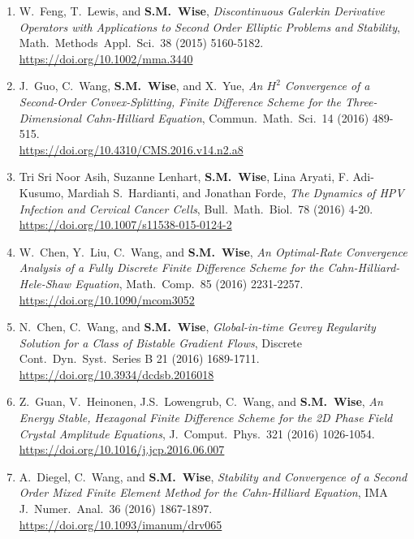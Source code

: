 \documentclass[10pt,letterpaper]{article}
\begin{document}
\begin{enumerate}
	\item    
W.~Feng, T.~Lewis, and \textbf{S.M.~Wise}, {\sl Discontinuous Galerkin Derivative Operators with Applications to Second Order Elliptic Problems and Stability}, Math.~Methods~Appl.~Sci.~38 (2015) 5160-5182.
	\\ 
\url{https://doi.org/10.1002/mma.3440}  

	\item
J.~Guo, C.~Wang, \textbf{S.M.~Wise}, and X.~Yue, {\sl An $H^2$ Convergence of a Second-Order Convex-Splitting, Finite Difference Scheme for the Three-Dimensional Cahn-Hilliard Equation}, Commun.~Math.~Sci.~14 (2016) 489-515.
	\\ 
\url{https://doi.org/10.4310/CMS.2016.v14.n2.a8}

	\item
Tri Sri Noor Asih, Suzanne Lenhart, \textbf{S.M.~Wise}, Lina Aryati, F. Adi-Kusumo, Mardiah S.~Hardianti, and Jonathan Forde, {\sl The Dynamics of HPV Infection and Cervical Cancer Cells}, Bull.~Math.~Biol.~78 (2016) 4-20.
	\\ 
\url{https://doi.org/10.1007/s11538-015-0124-2}

	\item
W.~Chen, Y.~Liu, C.~Wang, and \textbf{S.M.~Wise}, {\sl An Optimal-Rate Convergence Analysis of a Fully Discrete Finite Difference Scheme for the Cahn-Hilliard-Hele-Shaw Equation}, Math.~Comp.~85 (2016) 2231-2257.
	\\ 
\url{https://doi.org/10.1090/mcom3052}

	\item
N.~Chen, C.~Wang, and \textbf{S.M.~Wise}, {\sl Global-in-time Gevrey Regularity Solution for a Class of Bistable Gradient Flows}, Discrete Cont.~Dyn.~Syst.~Series B 21 (2016) 1689-1711.
	\\ 
\url{https://doi.org/10.3934/dcdsb.2016018}

	\item
Z.~Guan, V.~Heinonen, J.S.~Lowengrub, C.~Wang, and \textbf{S.M.~Wise}, {\sl An Energy Stable, Hexagonal Finite Difference Scheme for the 2D Phase Field Crystal Amplitude Equations}, J.~Comput.~Phys.~321 (2016) 1026-1054.
	\\ 
\url{https://doi.org/10.1016/j.jcp.2016.06.007}

	\item
A.~Diegel, C.~Wang, and \textbf{S.M.~Wise}, {\sl Stability and Convergence of a Second Order Mixed Finite Element Method for the Cahn-Hilliard Equation}, IMA J.~Numer.~Anal.~36 (2016) 1867-1897.
	\\ 
\url{https://doi.org/10.1093/imanum/drv065}


\end{enumerate}
\end{document}
